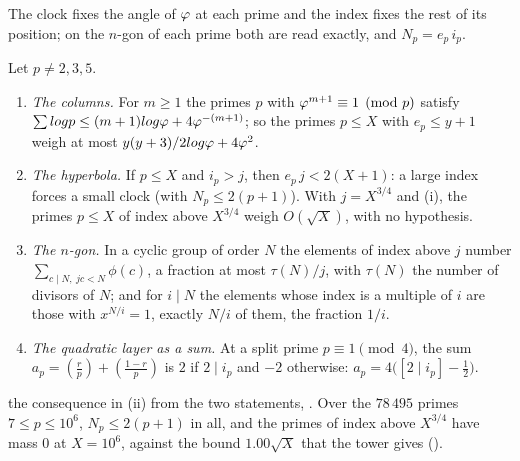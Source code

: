 The clock fixes the angle of $\varphi$ at each prime and the index fixes the rest of its
position; on the $n$-gon of each prime both are read exactly, and $N_p=e_p\,i_p$.

\begin{proposition}\label{prop:index-ngon}
Let $p\neq2,3,5$.
\begin{enumerate}[label=\textup{(\roman*)}]
  \item \emph{The columns.}  For $m\geq1$ the primes $p$ with $\varphi^{m+1}\equiv1\pmod p$
    satisfy $\sum log p\leq(m+1)log\varphi+4\varphi^{-(m+1)}$; so the primes $p\leq X$ with
    $e_p\leq y+1$ weigh at most $y(y+3)/2log\varphi+4\varphi^2$.

  \item \emph{The hyperbola.}  If $p\leq X$ and $i_p>j$, then $e_p\,j<2(X+1)$: a large index
    forces a small clock (with $N_p\leq2(p+1)$).  With $j=X^{3/4}$ and \textup{(i)}, the primes $p\leq X$ of index
    above $X^{3/4}$ weigh $O(\sqrt X)$, with no hypothesis.

  \item \emph{The $n$-gon.}  In a cyclic group of order $N$ the elements of index above $j$
    number $\sum_{c\mid N,\ jc<N}\phi(c)$, a fraction at most $\tau(N)/j$, with $\tau(N)$ the
    number of divisors of $N$; and for $i\mid N$ the elements whose index is a multiple of $i$
    are those with $x^{N/i}=1$, exactly $N/i$ of them, the fraction $1/i$.

  \item \emph{The quadratic layer as a sum.}  At a split prime $p\equiv1\pmod4$, the sum
    $a_p=(\tfrac rp)+(\tfrac{1-r}p)$ is $2$ if $2\mid i_p$ and $-2$ otherwise: $a_p=4\bigl([2\mid i_p]-\tfrac12\bigr)$.

\end{enumerate}
\end{proposition}

the consequence
in (ii) from the two statements, .  Over the $78\,495$ primes $7\leq p\leq10^6$, $N_p\leq2(p+1)$
in all, and the primes of index above $X^{3/4}$ have mass $0$ at $X=10^6$, against the
bound $1.00\sqrt X$ that the tower gives
().

